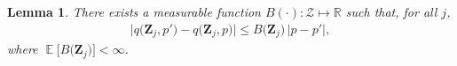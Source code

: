 \documentclass[11pt]{article}
\newcommand{\jp}[1]{\footnote{J-P: #1}}
\newtheorem{lemma}[thm]{Lemma}
\theoremstyle{remark}
\theoremstyle{definition}
\DeclareMathOperator{\exptn}{\mathbb{E}}
\newcommand{\bs}[1]{{\boldsymbol #1 }}
\numberwithin{equation}{section}
\begin{document}

\begin{lemma} \label{lemma:consistency:andrews}
    There exists a measurable function $B(\cdot): \mathscr{Z} \mapsto \mathbb{R}$ %
    such that, for all $j$,
    \begin{align*}
        \Big\vert q\big(\bs{Z}_j, p'\big) - q\big(\bs{Z}_j, p\big) \Big\vert \leq B\big(\bs{Z}_j\big)\, \big\vert p-p' \big\vert,
    \end{align*}
    where $\exptn\big[ B\big(\bs{Z}_j\big)\big] < \infty$.
\end{lemma}
\end{document}

